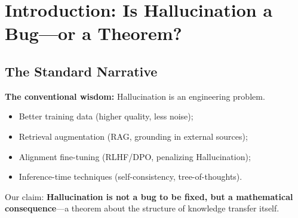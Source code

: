 \documentclass[12pt,a4paper]{article}
\theoremstyle{remark}
\begin{document}
\begin{abstract}
\begin{itemize}[itemsep=2pt]
    \item \textbf{Standard Hallucination:} Caused by training data gaps; potentially fixable with better data;
    \item \textbf{Distillation Hallucination:} Caused by the Disagreement structure of Distillation itself, \textbf{fundamentally unfixable}.
\end{itemize}

The Distillation-Galois-Disagreement-Hallucination nexus provides a unified theory of why distilled models must hallucinate.

\textbf{Keywords:} Hallucination; Distillation; Compactness; Galois Theory; Disagreement Group; model collapse; Distillation inevitability
\end{abstract}
\tableofcontents
\newpage
\section{Introduction: Is Hallucination a Bug---or a Theorem?}
\subsection{The Standard Narrative}
\textbf{The conventional wisdom:} Hallucination is an engineering problem.
\begin{itemize}[itemsep=3pt]
    \item Better training data (higher quality, less noise);
    \item Retrieval augmentation (RAG, grounding in external sources);
    \item Alignment fine-tuning (RLHF/DPO, penalizing Hallucination);
    \item Inference-time techniques (self-consistency, tree-of-thoughts).
\end{itemize}

Our claim: \textbf{Hallucination is not a bug to be fixed, but a mathematical consequence}---a theorem about the structure of knowledge transfer itself.

\begin{center}
\end{center}
\end{document}
